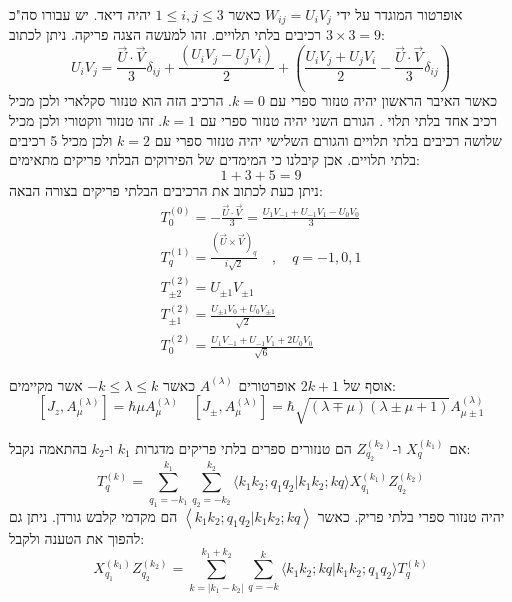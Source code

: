 \documentclass{tstextbook}
\begin{document}
\begin{example}
אופרטור המוגדר על ידי \(W_{ij}=U_{i}V_{j}\) כאשר \(1\leq i,j\leq 3\) יהיה דיאד. יש עבורו סה"כ \(3\times 3 = 9\) רכיבים בלתי תלויים. זהו למעשה הצגה פריקה. ניתן לכתוב:
$$U_{i}V_{j}={\frac{\vec{U}\cdot\vec{V}}{3}}\delta_{i j}+{\frac{(U_{i}V_{j}-U_{j}V_{i})}{2}}+\left({\frac{U_{i}V_{j}+U_{j}V_{i}}{2}}-{\frac{\vec{U}\cdot\vec{V}}{3}}\delta_{i j}\right)$$
כאשר האיבר הראשון יהיה טנזור ספרי עם \(k=0\). הרכיב הזה הוא טנזור סקלארי ולכן מכיל רכיב אחד בלתי תלוי . הגורם השני יהיה טנזור ספרי עם \(k=1\). זהו טנזור ווקטורי ולכן מכיל שלושה רכיבים בלתי תלויים והגורם השלישי יהיה טנזור ספרי עם \(k=2\) ולכן מכיל 5 רכיבים בלתי תלויים. אכן קיבלנו כי המימדים של הפירוקים הבלתי פריקים מתאימים:
$$1+3+5=9$$
ניתן כעת לכתוב את הרכיבים הבלתי פריקים בצורה הבאה:
$$\begin{gather}T_{0}^{(0)}=-\frac{\vec{U}\cdot\vec{V}}{3}=\frac{U_{1}V_{-1}+U_{-1}V_{1}-U_{0}V_{0}}{3}\\ T_{q}^{(1)}=\frac{\left( \vec{U}\times\vec{V} \right)_{q}}{i\sqrt{2}}\quad,\quad q=-1,0,1\\ T_{\pm2}^{(2)}=U_{\pm1}V_{\pm1}\\ T_{\pm1}^{(2)}=\frac{U_{\pm1}V_{0}+U_{0}V_{\pm1}}{\sqrt{2}}\\ T_{0}^{(2)}=\frac{U_{1}V_{-1}+U_{-1}V_{1}+2U_{0}V_{0}}{\sqrt{6}} 
\end{gather}$$

\end{example}
\begin{proposition}
אוסף של \(2k+1\) אופרטורים \(A^{\left( \lambda \right)}\) כאשר \(-k\leq \lambda \leq k\) אשר מקיימים:
$$\left[J_{z},A_{\mu}^{(\lambda)}\right]=\hbar\mu A_{\mu}^{(\lambda)}\quad\left[J_{\pm},A_{\mu}^{(\lambda)}\right]=\hbar\sqrt{\left(\lambda\mp\mu\right)\left(\lambda\pm\mu+1\right)}A_{\mu\pm1}^{(\lambda)}$$

\end{proposition}
\begin{proposition}
אם \(X_{q}^{(k_{1})}\) ו-\(Z_{q_{2}}^{(k_{2})}\) הם טנזורים ספרים בלתי פריקים מדגרות \(k_{1}\) ו-\(k_{2}\) בהתאמה נקבל:
$$T_{q}^{(k)}=\sum_{q_{1}=-k_{1}}^{k_{1}}\sum_{q_{2}=-k_{2}}^{k_{2}}\langle k_{1}k_{2};q_{1}q_{2}|k_{1}k_{2};k q\rangle X_{q_{1}}^{(k_{1})}Z_{q_{2}}^{(k_{2})}$$
יהיה טנזור ספרי בלתי פריק. כאשר \(\left\langle  k_{1}k_{2};q_{1}q_{2}|k_{1}k_{2};kq  \right\rangle\) הם מקדמי קלבש גורדן. ניתן גם להפוך את הטענה ולקבל:
$$X_{q_{1}}^{(k_{1})}Z_{q_{2}}^{(k_{2})}=\sum_{k=|k_{1}-k_{2}|}^{k_{1}+k_{2}}\sum_{q=-k}^{k}\langle k_{1}k_{2};k q|k_{1}k_{2};q_{1}q_{2}\rangle T_{q}^{(k)}$$

\end{proposition}
\end{document}

